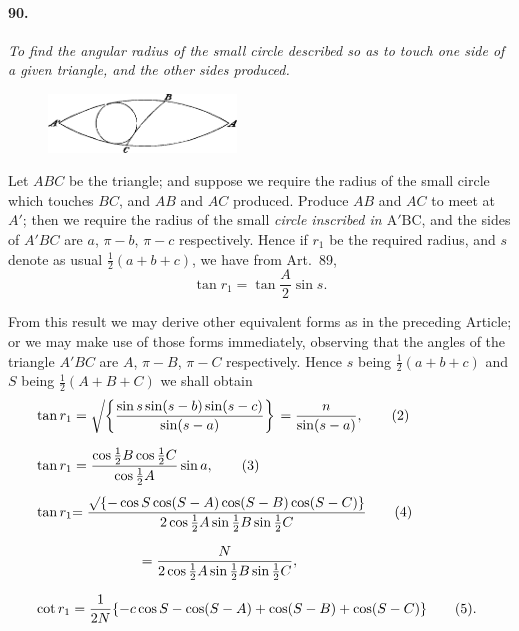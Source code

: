 \documentclass{book}[2004/02/16]
\newcommand{\Surd}[1]{\left\delimiter"4270370 #1\right.}
\begin{document}
\begin{mainmatter}
\begin{spacing}{1.3}
\paragraph{90.} \textit{To find the angular radius of the small circle described
so as to touch one side of a given triangle, and the other sides
produced.}
\begin{figure}[htp]
\centering
\includegraphics[width=5.0cm]{images/071fc}
\end{figure}

Let $ABC$ be the triangle; and suppose we require the radius
of the small circle which touches $BC$, and $AB$ and $AC$ produced.
Produce $AB$ and $AC$ to meet at $A'$; then we require the radius of
the small \textit{circle inscribed in $\mathrm{A'BC}$}, and the sides of $A'BC$ are $a$,
$\pi-b$, $\pi-c$ respectively. Hence if $r_1$ be the required radius, and
$s$ denote as usual $\frac{1}{2} (a + b + c)$, we have from Art.~89,
\[
  \tan r_1 = \tan\dfrac{A}{2}\sin s. \tag{1}
\]

From this result we may derive other equivalent forms as in
the preceding Article; or we may make use of those forms immediately,
observing that the angles of the triangle $A'BC$ are $A$,
$\pi-B$, $\pi-C$ respectively. Hence $s$ being $\frac{1}{2} (a + b + c)$ and $S$
being $\frac{1}{2} (A + B + C)$ we shall obtain
\begin{align*}
\tan r_1 &= \Surd{\left\{\dfrac{\sin s \sin(s-b)\sin(s-c)}
                         {\sin(s-a)}\right\}}
          = \dfrac{n}{\sin(s-a)}, \tag{2}
\\[1.5ex]
\tan r_1 &= \dfrac{\cos\tfrac{1}{2}B \cos\tfrac{1}{2}C}
                 {\cos\tfrac{1}{2}A} \sin a, \tag{3} \\[1ex]
\tan r_1 &
  \begin{gathered}[t]
  = \dfrac{\surd{\{-\cos S \cos(S-A) \cos(S-B) \cos(S-C)\}}}
         {2\cos\tfrac{1}{2}A \sin\tfrac{1}{2}B \sin\tfrac{1}{2}C} \notag
\\[1.5ex]
  = \dfrac{N}{2\cos\tfrac{1}{2}A \sin\tfrac{1}{2}B \sin\tfrac{1}{2}C},
  \end{gathered} \tag{4}
\\[1.5ex]
\multispan{2}{$\cot r_1 = \dfrac{1}{2N} \{-c\cos S - \cos(S-A) + \cos(S-B) + \cos(S-C) \} \tag{5}$.}
\end{align*}


\end{spacing}
\end{mainmatter}
\end{document}
